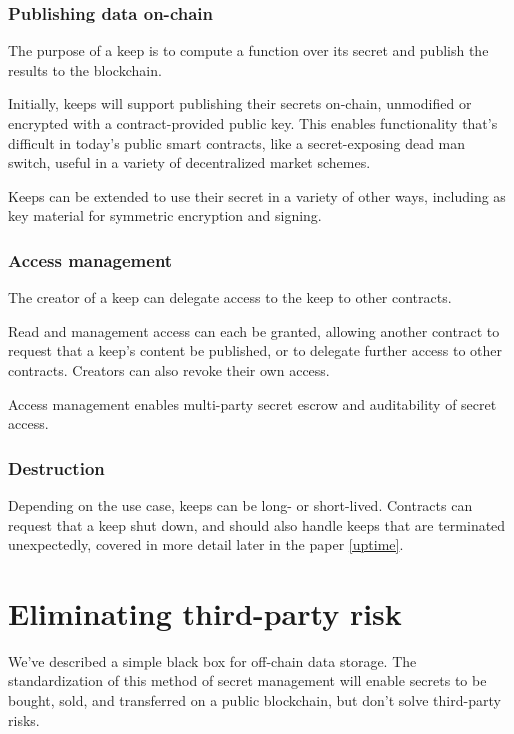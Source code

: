 \documentclass[11pt]{article}
\begin{document}
\subsubsection{Publishing data on-chain}

The purpose of a keep is to compute a function over its secret and
publish the results to the blockchain.

Initially, keeps will support publishing their secrets on-chain,
unmodified or encrypted with a contract-provided public key.  This
enables functionality that's difficult in today's public smart
contracts, like a secret-exposing dead man switch, useful in a variety
of decentralized market schemes.

Keeps can be extended to use their secret in a variety of other ways,
including as key material for symmetric encryption and signing.

\subsubsection{Access management}

The creator of a keep can delegate access to the keep to other
contracts.

Read and management access can each be granted, allowing another
contract to request that a keep's content be published, or to delegate
further access to other contracts. Creators can also revoke their own
access.

Access management enables multi-party secret escrow and auditability
of secret access.

\subsubsection{Destruction}

Depending on the use case, keeps can be long- or short-lived.
Contracts can request that a keep shut down, and should also handle
keeps that are terminated unexpectedly, covered in more detail later
in the paper \ref{uptime}.

\section{Eliminating third-party risk} \label{eliminatingRisk}

We've described a simple black box for off-chain data storage. The
standardization of this method of secret management will enable
secrets to be bought, sold, and transferred on a public blockchain,
but don't solve third-party risks.
\end{document}

